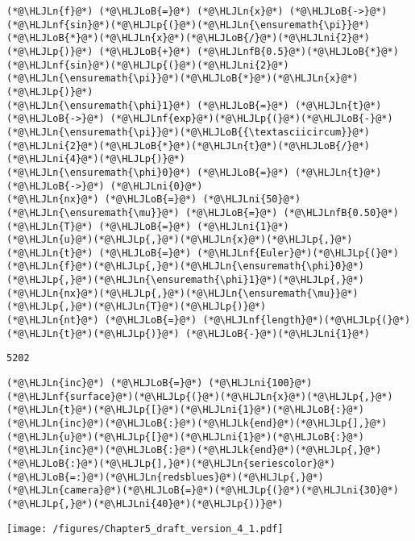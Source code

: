 \documentclass[12pt,a4paper]{article}
\newcommand{\HLJLk}[1]{\textcolor[RGB]{148,91,176}{\textbf{#1}}}
\newcommand{\HLJLn}[1]{#1}
\newcommand{\HLJLnf}[1]{\textcolor[RGB]{66,102,213}{#1}}
\newcommand{\HLJLnfB}[1]{\textcolor[RGB]{59,151,46}{#1}}
\newcommand{\HLJLni}[1]{\textcolor[RGB]{59,151,46}{#1}}
\newcommand{\HLJLoB}[1]{\textcolor[RGB]{102,102,102}{\textbf{#1}}}
\newcommand{\HLJLp}[1]{#1}
\begin{document}
\begin{lstlisting}
(*@\HLJLn{f}@*) (*@\HLJLoB{=}@*) (*@\HLJLn{x}@*) (*@\HLJLoB{->}@*) (*@\HLJLnf{sin}@*)(*@\HLJLp{(}@*)(*@\HLJLn{\ensuremath{\pi}}@*)(*@\HLJLoB{*}@*)(*@\HLJLn{x}@*)(*@\HLJLoB{/}@*)(*@\HLJLni{2}@*)(*@\HLJLp{)}@*) (*@\HLJLoB{+}@*) (*@\HLJLnfB{0.5}@*)(*@\HLJLoB{*}@*)(*@\HLJLnf{sin}@*)(*@\HLJLp{(}@*)(*@\HLJLni{2}@*)(*@\HLJLn{\ensuremath{\pi}}@*)(*@\HLJLoB{*}@*)(*@\HLJLn{x}@*)(*@\HLJLp{)}@*)
(*@\HLJLn{\ensuremath{\phi}1}@*) (*@\HLJLoB{=}@*) (*@\HLJLn{t}@*) (*@\HLJLoB{->}@*) (*@\HLJLnf{exp}@*)(*@\HLJLp{(}@*)(*@\HLJLoB{-}@*)(*@\HLJLn{\ensuremath{\pi}}@*)(*@\HLJLoB{{\textasciicircum}}@*)(*@\HLJLni{2}@*)(*@\HLJLoB{*}@*)(*@\HLJLn{t}@*)(*@\HLJLoB{/}@*)(*@\HLJLni{4}@*)(*@\HLJLp{)}@*)
(*@\HLJLn{\ensuremath{\phi}0}@*) (*@\HLJLoB{=}@*) (*@\HLJLn{t}@*) (*@\HLJLoB{->}@*) (*@\HLJLni{0}@*)
(*@\HLJLn{nx}@*) (*@\HLJLoB{=}@*) (*@\HLJLni{50}@*)
(*@\HLJLn{\ensuremath{\mu}}@*) (*@\HLJLoB{=}@*) (*@\HLJLnfB{0.50}@*)
(*@\HLJLn{T}@*) (*@\HLJLoB{=}@*) (*@\HLJLni{1}@*)
(*@\HLJLn{u}@*)(*@\HLJLp{,}@*)(*@\HLJLn{x}@*)(*@\HLJLp{,}@*)(*@\HLJLn{t}@*) (*@\HLJLoB{=}@*) (*@\HLJLnf{Euler}@*)(*@\HLJLp{(}@*)(*@\HLJLn{f}@*)(*@\HLJLp{,}@*)(*@\HLJLn{\ensuremath{\phi}0}@*)(*@\HLJLp{,}@*)(*@\HLJLn{\ensuremath{\phi}1}@*)(*@\HLJLp{,}@*)(*@\HLJLn{nx}@*)(*@\HLJLp{,}@*)(*@\HLJLn{\ensuremath{\mu}}@*)(*@\HLJLp{,}@*)(*@\HLJLn{T}@*)(*@\HLJLp{)}@*)
(*@\HLJLn{nt}@*) (*@\HLJLoB{=}@*) (*@\HLJLnf{length}@*)(*@\HLJLp{(}@*)(*@\HLJLn{t}@*)(*@\HLJLp{)}@*) (*@\HLJLoB{-}@*)(*@\HLJLni{1}@*)
\end{lstlisting}

\begin{lstlisting}
5202
\end{lstlisting}


\begin{lstlisting}
(*@\HLJLn{inc}@*) (*@\HLJLoB{=}@*) (*@\HLJLni{100}@*)
(*@\HLJLnf{surface}@*)(*@\HLJLp{(}@*)(*@\HLJLn{x}@*)(*@\HLJLp{,}@*)(*@\HLJLn{t}@*)(*@\HLJLp{[}@*)(*@\HLJLni{1}@*)(*@\HLJLoB{:}@*)(*@\HLJLn{inc}@*)(*@\HLJLoB{:}@*)(*@\HLJLk{end}@*)(*@\HLJLp{],}@*)(*@\HLJLn{u}@*)(*@\HLJLp{[}@*)(*@\HLJLni{1}@*)(*@\HLJLoB{:}@*)(*@\HLJLn{inc}@*)(*@\HLJLoB{:}@*)(*@\HLJLk{end}@*)(*@\HLJLp{,}@*)(*@\HLJLoB{:}@*)(*@\HLJLp{],}@*)(*@\HLJLn{seriescolor}@*)(*@\HLJLoB{=:}@*)(*@\HLJLn{redsblues}@*)(*@\HLJLp{,}@*) (*@\HLJLn{camera}@*)(*@\HLJLoB{=}@*)(*@\HLJLp{(}@*)(*@\HLJLni{30}@*)(*@\HLJLp{,}@*)(*@\HLJLni{40}@*)(*@\HLJLp{))}@*)
\end{lstlisting}

\texttt{[image: /figures/Chapter5\_draft\_version\_4\_1.pdf]}
\end{document}
